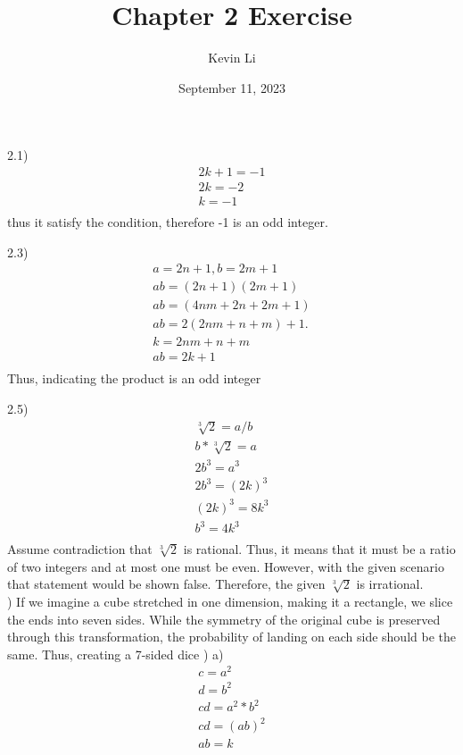 \documentclass{article}
\title{Chapter 2 Exercise}
\author{Kevin Li}
\date{September 11, 2023}
\begin{document}
\maketitle
\pagebreak
\begin{spacing}{2}
  2.1)
  \begin{align*}
    2k+1 = -1\\
    2k = -2\\
    k = -1\\
  \end{align*}
  thus it satisfy the condition, therefore -1 is an odd integer.
  

  2.3)
  \begin{align*}
    a = 2n+1, b = 2m+1\\
    ab = (2n+1)(2m+1)\\
    ab = (4nm+2n+2m+1)\\
    ab = 2(2nm+n+m)+1.\\
    k = 2nm+n+m\\
    ab = 2k+1\\
  \end{align*}
  Thus, indicating the product is an odd integer  

  2.5)
  \begin{align*}
    \sqrt[3]{2} = a/b\\
    b * \sqrt[3]{2} = a\\
    2b^{3} = a^{3}\\
    2b^{3} = (2k)^{3}\\
    (2k)^{3} = 8k^{3}\\
    b^{3} = 4k^{3}\\
  \end{align*}
  Assume contradiction that $\sqrt[3]{2}$ is rational. Thus, it means that it must be a ratio of two integers and at most one must be even. However, with the given scenario that statement would be shown false. Therefore, the given $\sqrt[3]{2}$ is irrational.\\
  ) If we imagine a cube stretched in one dimension, making it a rectangle, we slice the ends into seven sides. While the symmetry of the original cube is preserved through this transformation, the probability of landing on each side should be the same. Thus, creating a 7-sided dice
  )
  a)
  \begin{align*}
    c =  a^{2}\\
    d =  b^{2} \\
    cd =  a^{2}  *  b^{2} \\
    cd = (ab)^{2}\\
    ab = k\\
  \end{align*}
  

\end{spacing}
\end{document}
